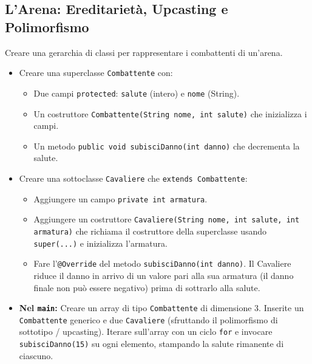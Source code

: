 \documentclass{article}
\begin{document}
\subsection{L'Arena: Ereditarietà, Upcasting e Polimorfismo}
Creare una gerarchia di classi per rappresentare i combattenti di un'arena.
\begin{itemize}
    \item Creare una superclasse \texttt{Combattente} con:
    \begin{itemize}
        \item Due campi \texttt{protected}: \texttt{salute} (intero) e \texttt{nome} (String).
        \item Un costruttore \texttt{Combattente(String nome, int salute)} che inizializza i campi.
        \item Un metodo \texttt{public void subisciDanno(int danno)} che decrementa la salute.
    \end{itemize}
    \item Creare una sottoclasse \texttt{Cavaliere} che \texttt{extends Combattente}:
    \begin{itemize}
        \item Aggiungere un campo \texttt{private int armatura}.
        \item Aggiungere un costruttore \texttt{Cavaliere(String nome, int salute, int armatura)} che richiama il costruttore della superclasse usando \texttt{super(...)} e inizializza l'armatura.
        \item Fare l'\texttt{@Override} del metodo \texttt{subisciDanno(int danno)}. Il Cavaliere riduce il danno in arrivo di un valore pari alla sua armatura (il danno finale non può essere negativo) prima di sottrarlo alla salute.
    \end{itemize}
    \item \textbf{Nel \texttt{main}:} Creare un array di tipo \texttt{Combattente} di dimensione 3. Inserite un \texttt{Combattente} generico e due \texttt{Cavaliere} (sfruttando il polimorfismo di sottotipo / upcasting). Iterare sull'array con un ciclo \texttt{for} e invocare \texttt{subisciDanno(15)} su ogni elemento, stampando la salute rimanente di ciascuno.
\end{itemize}
\end{document}
